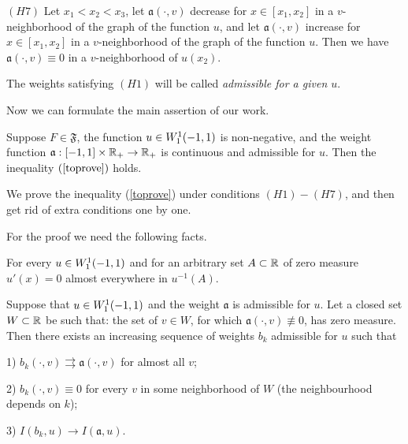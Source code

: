 \bigskip
\noindent
$(H7)$ Let $x_1 < x_2 < x_3$,
let $\mathfrak a(\cdot, v)$ decrease for $x \in [x_1, x_2]$ in a $v$-neighborhood of the graph of the function $u$,
and let $\mathfrak a(\cdot, v)$ increase for $x \in [x_1, x_2]$ in a $v$-neighborhood of the graph of the function $u$.
Then we have $\mathfrak a(\cdot, v) \equiv 0$ in a $v$-neighborhood of $u(x_2)$.

\bigskip

The weights satisfying $(H1)$ will be called {\it admissible for a given $u$}.

\medskip

Now we can formulate the main assertion of our work.
\begin{thm}
\label{mainThm}
Suppose $F \in \mathfrak{F}$, the function $u \in W_1^1(-1, 1)$ is non-negative,
and the weight function $\mathfrak a: [-1, 1] \times \mathbb R_+ \to \mathbb R_+$ is continuous
and admissible for $u$.
Then the inequality $(\ref{toprove})$ holds.
\end{thm}

We prove the inequality (\ref{toprove}) under conditions $(H1)-(H7)$,
and then get rid of extra conditions one by one.

For the proof we need the following facts.

\begin{prop}
\label{levelDerivative}
{\rm \cite[Theorem 6.19]{LL} }
For every $u \in W_1^1(-1, 1)$ and for an arbitrary set $A \subset \mathbb R$ of zero measure
$u'(x) = 0$ almost everywhere in $u^{-1}(A)$.
\end{prop}

\begin{lm}
\label{zeroApprox}
Suppose that $u \in W_1^1(-1, 1)$ and the weight $\mathfrak a$ is admissible for $u$.
Let a closed set $W \subset \mathbb R$ be such that:
the set of $v \in W$, for which $\mathfrak a(\cdot, v) \not\equiv 0$, has zero measure.
Then there exists an increasing sequence of weights $b_k$ admissible for $u$ such that

1) $b_k(\cdot, v) \rightrightarrows \mathfrak a(\cdot, v)$ for almost all $v$;

2) $b_k(\cdot, v) \equiv 0$ for every $v$ in some neighborhood of $W$ (the neighbourhood depends on $k$);

3) $I(b_k, u) \to I(\mathfrak a, u)$.
\end{lm}

